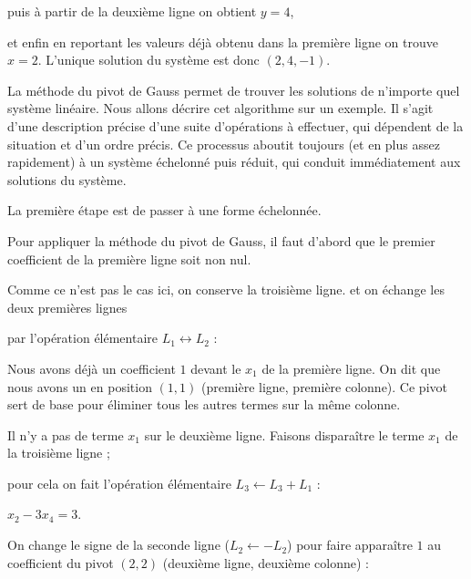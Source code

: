 puis à partir de la deuxième ligne on obtient  $y=4$,

et enfin en reportant les valeurs déjà obtenu dans la première ligne on trouve $x=2$. 
L'unique solution du système est donc $(2,4,-1)$.


\diapo

La méthode du pivot de Gauss permet de trouver les solutions de n'importe 
quel système linéaire.
Nous allons décrire cet algorithme sur un exemple.
Il s'agit d'une description précise d'une suite d'opérations à effectuer, 
qui dépendent de la situation et d'un ordre précis. Ce processus 
aboutit toujours (et en plus assez rapidement)
à un système échelonné puis réduit, qui conduit immédiatement aux solutions du système.

\change

La première étape est de passer à une forme échelonnée.

\change



Pour appliquer la méthode du pivot de Gauss, il faut 
d'abord que le premier coefficient de la première ligne soit non nul.

\change

Comme ce n'est pas le cas ici,
on conserve la troisième ligne.
et on échange les deux premières lignes 

\change 

par l'opération élémentaire
$L_1 \leftrightarrow L_2$ :


\change

Nous avons déjà un coefficient $1$ devant le $x_1$ de la première ligne.
On dit que nous avons un  en position $(1,1)$ (première ligne, première colonne).
Ce pivot sert de base pour éliminer tous les autres termes sur la même colonne.

Il n'y a pas de terme $x_1$ sur le deuxième ligne.
Faisons disparaître le terme $x_1$ de la troisième ligne ;

\change

\change

pour cela on fait l'opération élémentaire $L_3 \leftarrow L_3+L_1$ :

$x_2   -3x_4  = 3$.


\diapo
On change le signe de la seconde ligne ($L_2 \leftarrow -L_2$) pour faire apparaître 
$1$ au coefficient du pivot $(2,2)$ (deuxième ligne, deuxième colonne) :

